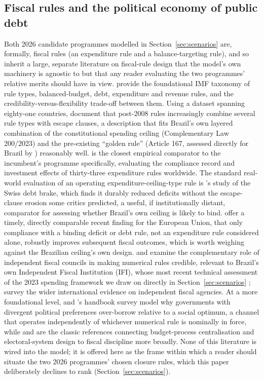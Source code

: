 \documentclass[11pt,a4paper]{article}
\begin{document}
\subsection{Fiscal rules and the political economy of public debt}
\label{sec:lit-rules}

Both 2026 candidate programmes modelled in Section~\ref{sec:scenarios} are, formally, fiscal rules (an expenditure rule and a balance-targeting rule), and so inherit a large, separate literature on fiscal-rule design that the model's own machinery is agnostic to but that any reader evaluating the two programmes' relative merits should have in view. \citet{kopitssymansky1998} provide the foundational IMF taxonomy of rule types, balanced-budget, debt, expenditure and revenue rules, and the credibility-versus-flexibility trade-off between them. Using a dataset spanning eighty-one countries, \citet{schaechteretal2012} document that post-2008 rules increasingly combine several rule types with escape clauses, a description that fits Brazil's own layered combination of the constitutional spending ceiling (Complementary Law 200/2023) and the pre-existing ``golden rule'' (Article 167, assessed directly for Brazil by \citealp{pires2019reggraouro}) reasonably well. \citet{cordesetal2015} is the closest empirical comparator to the incumbent's programme specifically, evaluating the compliance record and investment effects of thirty-three expenditure rules worldwide. The standard real-world evaluation of an operating expenditure-ceiling-type rule is \citet{feldkirchgassner2008}'s study of the Swiss debt brake, which finds it durably reduced deficits without the escape-clause erosion some critics predicted, a useful, if institutionally distant, comparator for assessing whether Brazil's own ceiling is likely to bind. \citet{lopezvillavicencio2025} offer a timely, directly comparable recent finding for the European Union, that only compliance with a binding deficit or debt rule, not an expenditure rule considered alone, robustly improves subsequent fiscal outcomes, which is worth weighing against the Brazilian ceiling's own design. \citet{debrunkumar2007} and \citet{wyplosz2018} examine the complementary role of independent fiscal councils in making numerical rules credible, relevant to Brazil's own Independent Fiscal Institution (IFI), whose most recent technical assessment of the 2023 spending framework we draw on directly in Section~\ref{sec:scenarios} \citep{ifi2023raf76}; \citet{debrunhaunerkumar2009} survey the wider international evidence on independent fiscal agencies. At a more foundational level, \citet{alesinatabellini1990} and \citet{alesinapassalacqua2016}'s handbook survey model why governments with divergent political preferences over-borrow relative to a social optimum, a channel that operates independently of whichever numerical rule is nominally in force, while \citet{vonhagenharden1995} and \citet{perssontabellini1999} are the classic references connecting budget-process centralisation and electoral-system design to fiscal discipline more broadly. None of this literature is wired into the model; it is offered here as the frame within which a reader should situate the two 2026 programmes' chosen closure rules, which this paper deliberately declines to rank (Section~\ref{sec:scenarios}).
\end{document}
